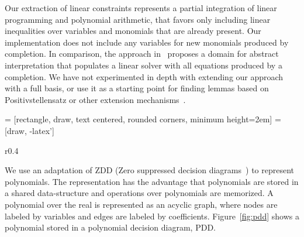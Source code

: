 Our extraction of linear constraints represents a partial integration of linear programming and polynomial arithmetic,
that favors only including linear inequalities over variables and monomials that are already present. Our implementation
does not include any variables for new monomials produced by completion.
In comparison, the approach in~\cite{DBLP:journals/pacmpl/KincaidKZ23} proposes a domain for abstract interpretation that populates a linear
solver with all equations produced by a completion. We have not experimented in depth with extending our approach with a full basis,
or use it as a starting point for finding lemmas based on Positivstellensatz or other extension mechanisms~\cite{DBLP:conf/csl/Tiwari05,DBLP:conf/cade/PlatzerQR09}.





\usetikzlibrary{shapes,arrows}
\usetikzlibrary{positioning}

 = [rectangle, draw, text centered, rounded corners, minimum height=2em]
 = [draw, -latex']

\begin{wrapfigure}{r}{0.4\textwidth} 
  \begin{center}

  \end{center}
  \vspace{1pt}
  \caption{PDD representation of $5x^2y + xy + y + x + 1$\label{fig:pdd}}
\end{wrapfigure}
We use an adaptation of ZDD (Zero suppressed decision diagrams~\cite{Minato93,NishinoYMN16}) to represent polynomials.
The representation has the advantage that polynomials are stored in a shared data-structure and operations
over polynomials are memorized. A polynomial over the real is represented as an acyclic graph, where 
nodes are labeled by variables and edges are labeled by coefficients. Figure~\ref{fig:pdd} shows a polynomial stored
in a polynomial decision diagram, PDD.


